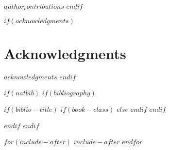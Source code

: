 \documentclass[webpdf$if(papersize)$,$papersize$$else$,large$endif$$if(document-style)$,$document-style$$else$,contemporary$endif$$if(numbersections)$$else$,unnumsec$endif$$if(namedate)$,namedate$endif$$if(classoptions)$,$for(classoptions)$$classoptions$$sep$,$endfor$$endif$]{oup-authoring-template}
\theoremstyle{thmstyleone}%
\theoremstyle{thmstyletwo}%
\theoremstyle{thmstylethree}%
\begin{document}
$author_contributions$
$endif$

$if(acknowledgments)$
\section{Acknowledgments}

$acknowledgments$
$endif$

$if(natbib)$
$if(bibliography)$

$if(biblio-title)$
$if(book-class)$
\renewcommand\bibname{$biblio-title$}
$else$
\renewcommand\refname{$biblio-title$}
$endif$
$endif$


$endif$
$endif$




$for(include-after)$
$include-after$
$endfor$
\end{document}
